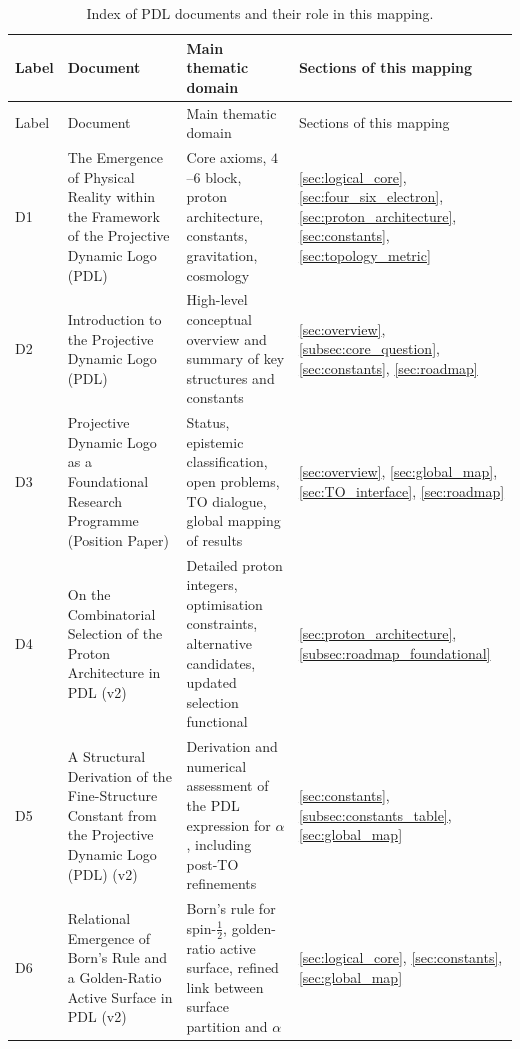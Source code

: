 \documentclass{article}
\begin{document}
\begin{longtable}{@{}p{0.9cm}L{5cm}L{5cm}p{4.4cm}@{}}
  \caption{Index of PDL documents and their role in this mapping.}
  \label{tab:doc_index}\\

  \toprule
  Label & Document & Main thematic domain & Sections of this mapping \\
  \midrule
  \endfirsthead

  \toprule
  Label & Document & Main thematic domain & Sections of this mapping \\
  \midrule
  \endhead

  \bottomrule
  \endfoot

  D1 &
  The Emergence of Physical Reality within the Framework of the Projective Dynamic Logo (PDL) &
  Core axioms, $4$--$6$ block, proton architecture, constants, gravitation, cosmology &
  \ref{sec:logical_core}, \ref{sec:four_six_electron}, \ref{sec:proton_architecture}, \ref{sec:constants}, \ref{sec:topology_metric} \\[0.4em]

  D2 &
  Introduction to the Projective Dynamic Logo (PDL) &
  High-level conceptual overview and summary of key structures and constants &
  \ref{sec:overview}, \ref{subsec:core_question}, \ref{sec:constants}, \ref{sec:roadmap} \\[0.4em]

  D3 &
  Projective Dynamic Logo as a Foundational Research Programme (Position Paper) &
  Status, epistemic classification, open problems, TO dialogue, global mapping of results &
  \ref{sec:overview}, \ref{sec:global_map}, \ref{sec:TO_interface}, \ref{sec:roadmap} \\[0.4em]

  D4 &
  On the Combinatorial Selection of the Proton Architecture in PDL (v2) &
  Detailed proton integers, optimisation constraints, alternative candidates, updated selection functional &
  \ref{sec:proton_architecture}, \ref{subsec:roadmap_foundational} \\[0.4em]

  D5 &
  A Structural Derivation of the Fine-Structure Constant from the Projective Dynamic Logo (PDL) (v2) &
  Derivation and numerical assessment of the PDL expression for $\alpha$, including post-TO refinements &
  \ref{sec:constants}, \ref{subsec:constants_table}, \ref{sec:global_map} \\[0.4em]

  D6 &
  Relational Emergence of Born's Rule and a Golden-Ratio Active Surface in PDL (v2) &
  Born's rule for spin-$\tfrac{1}{2}$, golden-ratio active surface, refined link between surface partition and $\alpha$ &
  \ref{sec:logical_core}, \ref{sec:constants}, \ref{sec:global_map} \\[0.4em]


\end{longtable}
\end{document}
